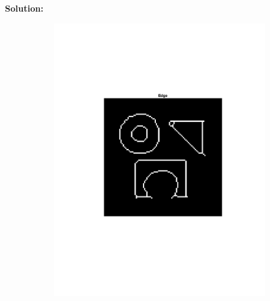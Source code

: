\documentclass[12pt]{article}
\begin{document}
\begin{enumerate}[label=\bfseries Problem \arabic*:]
\vspace{1em}
\textbf{Solution:}\\
    \begin{figure}[H]
        \begin{subfigure}[t!]{.5\textwidth}
            \includegraphics[width=\linewidth]{MyEdgeDetector_1.pdf}
        \end{subfigure}%
        \begin{subfigure}[t!]{.5\textwidth}

\end{subfigure}
\end{figure}
\end{enumerate}
\end{document}
